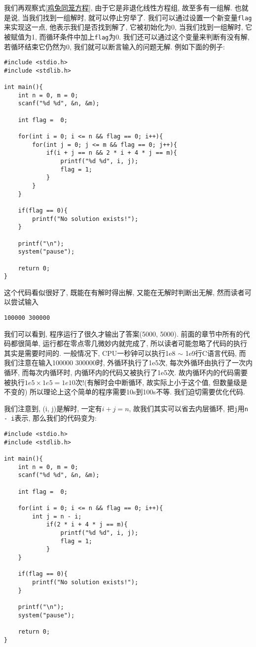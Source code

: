         我们再观察式\ref{鸡兔同笼方程}, 由于它是非退化线性方程组, 故至多有一组解. 也就是说, 当我们找到一组解时, 就可以停止穷举了. 我们可以通过设置一个新变量\texttt{flag}来实现这一点, 他表示我们是否找到解了, 它被初始化为0, 当我们找到一组解时, 它被赋值为1, 而循环条件中加上\texttt{flag}为0. 我们还可以通过这个变量来判断有没有解, 若循环结束它仍然为0, 我们就可以断言输入的问题无解. 例如下面的例子:
\begin{lstlisting}
#include <stdio.h>
#include <stdlib.h>

int main(){
    int n = 0, m = 0;
    scanf("%d %d", &n, &m);

    int flag =  0;

    for(int i = 0; i <= n && flag == 0; i++){
        for(int j = 0; j <= m && flag == 0; j++){
            if(i + j == n && 2 * i + 4 * j == m){
                printf("%d %d", i, j);
                flag = 1;
            }
        }
    }

    if(flag == 0){
        printf("No solution exists!");
    }

    printf("\n");
    system("pause");

    return 0;
}
\end{lstlisting}

        这个代码看似很好了, 既能在有解时得出解, 又能在无解时判断出无解, 然而读者可以尝试输入
\begin{lstlisting}
100000 300000
\end{lstlisting}

        我们可以看到, 程序运行了很久才输出了答案(5000, 5000). 前面的章节中所有的代码都很简单, 运行都在零点零几微妙内就完成了, 所以读者可能忽略了代码的执行其实是需要时间的. 一般情况下, CPU一秒钟可以执行1e8 $\sim$ 1e9行C语言代码, 而我们注意在输入100000 300000时, 外循环执行了1e5次, 每次外循环由执行了一次内循环, 而每次内循环时, 内循环内的代码又被执行了1e5次. 故内循环内的代码需要被执行$1e5 \times 1e5 = 1e10$次!(有解时会中断循环, 故实际上小于这个值, 但数量级是不变的) 所以理论上这个简单的程序需要10s到100s不等. 我们迫切需要优化代码.

        我们注意到, (i, j)是解时, 一定有$i + j = n$, 故我们其实可以省去内层循环, 把\texttt{j}用\texttt{n - i}表示, 那么我们的代码变为:
\begin{lstlisting}
#include <stdio.h>
#include <stdlib.h>

int main(){
    int n = 0, m = 0;
    scanf("%d %d", &n, &m);

    int flag =  0;

    for(int i = 0; i <= n && flag == 0; i++){
        int j = n - i;
            if(2 * i + 4 * j == m){
                printf("%d %d", i, j);
                flag = 1;
            }
    }

    if(flag == 0){
        printf("No solution exists!");
    }

    printf("\n");
    system("pause");

    return 0;
}
\end{lstlisting}

